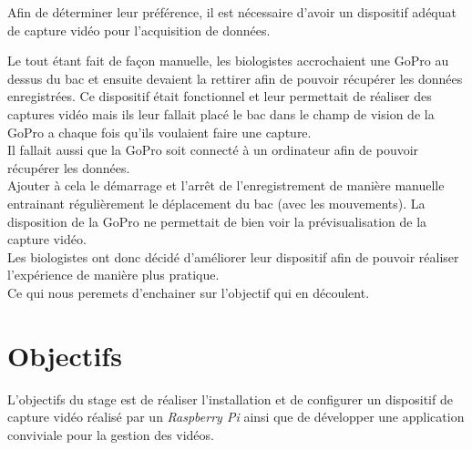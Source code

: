     Afin de déterminer leur préférence, il est nécessaire d'avoir un dispositif adéquat de capture vidéo pour l'acquisition de données.

    \vspace{0.5cm}

    \begin{flushleft}
        Le tout étant fait de façon manuelle, les biologistes accrochaient une GoPro au dessus du bac et ensuite devaient la rettirer afin de pouvoir récupérer les données enregistrées. Ce dispositif était fonctionnel et leur permettait de réaliser des captures vidéo mais ils leur fallait placé le bac dans le champ de vision de la GoPro a chaque fois qu'ils voulaient faire une capture.\\[0.2cm]
        
        Il fallait aussi que la GoPro soit connecté à un ordinateur afin de pouvoir récupérer les données.\\[0.2cm]

        Ajouter à cela le démarrage et l'arrêt de l'enregistrement de manière manuelle entrainant régulièrement le déplacement du bac (avec les mouvements). La disposition de la GoPro ne permettait de bien voir la prévisualisation de la capture vidéo.\\[0.2cm]

        Les biologistes ont donc décidé d'améliorer leur dispositif afin de pouvoir réaliser l'expérience de manière plus pratique.\\[0.2cm]

        Ce qui nous peremets d'enchainer sur l'objectif qui en découlent.

    \end{flushleft}

    \vspace{0.1cm}


    \section{Objectifs}
    L'objectifs du stage est de réaliser l'installation et de configurer un dispositif de capture vidéo réalisé par un \textit{Raspberry Pi} ainsi que de développer une application conviviale pour la gestion des vidéos.

    \vspace{0.1cm}

